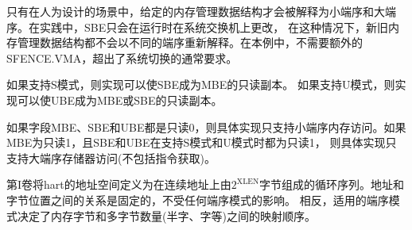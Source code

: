 \begin{commentary}
只有在人为设计的场景中，给定的内存管理数据结构才会被解释为小端序和大端序。在实践中，SBE只会在运行时在系统交换机上更改，
在这种情况下，新旧内存管理数据结构都不会以不同的端序重新解释。在本例中，不需要额外的SFENCE.VMA，超出了系统切换的通常要求。
\end{commentary}

\iffalse
If S-mode is supported, an implementation may make SBE be a read-only
copy of MBE.
If U-mode is supported, an implementation may make UBE be a read-only
copy of either MBE or SBE.
\fi

如果支持S模式，则实现可以使SBE成为MBE的只读副本。
如果支持U模式，则实现可以使UBE成为MBE或SBE的只读副本。

\iffalse
\begin{commentary}
An implementation supports only little-endian memory accesses if fields
MBE, SBE, and UBE are all read-only~0.
An implementation supports only big-endian memory accesses (aside from
instruction fetches) if MBE is read-only 1 and SBE and UBE are each
read-only 1 when S-mode and U-mode are supported.
\end{commentary}
\fi

\begin{commentary}
如果字段MBE、SBE和UBE都是只读0，则具体实现只支持小端序内存访问。如果MBE为只读1，且SBE和UBE在支持S模式和U模式时都为只读1，
则具体实现只支持大端序存储器访问(不包括指令获取)。
\end{commentary}

\iffalse
\begin{commentary}
Volume I defines a hart's address space as a circular sequence of
$2^{\text{XLEN}}$ bytes at consecutive addresses.
The correspondence between addresses and byte locations is fixed and not
affected by any endianness mode.
Rather, the applicable endianness mode determines the order of mapping
between memory bytes and a multibyte quantity (halfword, word, etc.).
\end{commentary}
\fi

\begin{commentary}
第I卷将hart的地址空间定义为在连续地址上由$2^{\text{XLEN}}$字节组成的循环序列。地址和字节位置之间的关系是固定的，不受任何端序模式的影响。
相反，适用的端序模式决定了内存字节和多字节数量(半字、字等)之间的映射顺序。
\end{commentary}

\iffalse
\begin{commentary}
Standard RISC-V ABIs are expected to be purely little-endian-only or
big-endian-only, with no accommodation for mixing endianness.
Nevertheless, endianness control has been defined so as to permit, for
instance, an OS of one endianness to execute user-mode programs of the
opposite endianness.
Consideration has been given also to the possibility of nonstandard
usages whereby software flips the endianness of memory accesses as
needed.
\end{commentary}
\fi

